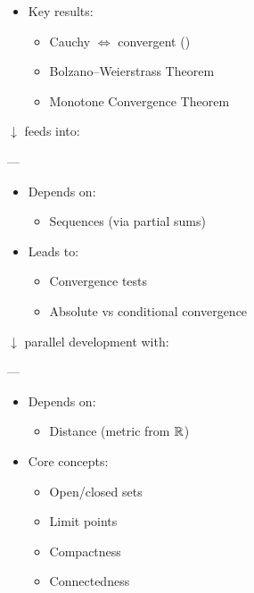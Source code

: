 \documentclass[12pt,a4paper]{report}
\begin{document}
\begin{description}
\begin{itemize}
    \item Key results:

		\begin{itemize}
        \item Cauchy $\iff$ convergent ()
        \item Bolzano–Weierstrass Theorem
        \item Monotone Convergence Theorem
		\end{itemize}
	\end{itemize}

$\downarrow$ feeds into:

---

\item {}

	\begin{itemize}
    \item Depends on:

		\begin{itemize}
        \item Sequences (via partial sums)
		\end{itemize}

    \item Leads to:

		\begin{itemize}
        \item Convergence tests
        \item Absolute vs conditional convergence
		\end{itemize}
	\end{itemize}

$\downarrow$ parallel development with:

---

\item {}

	\begin{itemize}
    \item Depends on:

		\begin{itemize}
        \item Distance (metric from $\mathbb{R}$)
		\end{itemize}

    \item Core concepts:

		\begin{itemize}
        \item Open/closed sets
        \item Limit points
        \item Compactness
        \item Connectedness
		\end{itemize}


\end{itemize}
\end{description}
\end{document}
